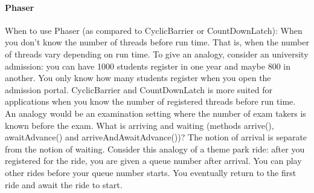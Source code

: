 \documentclass{article}
\begin{document}


\paragraph{Phaser} When to use Phaser (as compared to CyclicBarrier or CountDownLatch): When you don't know the number of threads before run time. That is, when the number of threads vary depending on run time. To give an analogy, consider an university admission: you can have 1000 students register in one year and maybe 800 in another. You only know how many students register when you open the admission portal. CyclicBarrier and CountDownLatch is more suited for applications when you know the number of registered threads before run time. An analogy would be an examination setting where the number of exam takers is known before the exam. What is arriving and waiting (methods arrive(), awaitAdvance() and arriveAndAwaitAdvance())? The notion of arrival is separate from the notion of waiting. Consider this analogy of a theme park ride: after you registered for the ride, you are given a queue number after arrival. You can play other rides before your queue number starts. You eventually return to the first ride and await the ride to start.
\end{document}
